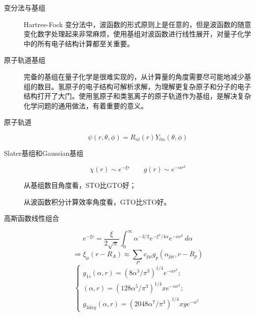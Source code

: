 \documentclass{article}
\numberwithin{equation}{section}
\begin{document}
\begin{description}
	\item[变分法与基组] Hartree-Fock 变分法中，波函数的形式原则上是任意的，但是波函数的随意变化数字处理起来非常麻烦，使用基组对波函数进行线性展开，对量子化学中的所有电子结构计算都至关重要。

	\item[原子轨道基组] 完备的基组在量子化学是很难实现的，从计算量的角度需要尽可能地减少基组的数目。氢原子的电子结构可解析求解，为理解更复杂原子和分子的电子结构打开了大门。使用氢原子和类氢离子的原子轨道作为基组，是解决复杂化学问题的通用做法，有着重要的意义。

	\item[原子轨道]
	\begin{equation}
		\psi(r,\theta,\phi)=R_{nl}(r)Y_{lm}(\theta,\phi)
	\end{equation}

	\item[Slater基组和Gaussian基组]
	\begin{equation}
	\chi(r)\sim e^{-\xi r} \qquad g(r)\sim e^{-\alpha r^2}
	\end{equation}

	从基组数目角度看，STO比GTO好；

	从波函数积分计算效率角度看，GTO比STO好。

	\item[高斯函数线性组合]
	\begin{equation}
	e^{-\xi r}=\frac{\xi}{2\sqrt{\pi}}\int_0^\infty \alpha^{-3/2} e^{-\xi^2/4\alpha}e^{-\alpha r^2} \, d\alpha
	\end{equation}
	\begin{equation}
	\Rightarrow \xi_\mu(r-R_A)\approx \sum_Pc_{p\mu}g_p(\alpha_{p\mu},r-R_p)
	\end{equation}
	\begin{equation}
	\begin{cases}
	g_{1s}(\alpha,r)=(8\alpha^3/\pi^3)^{1/4}e^{-\alpha r^2};\\
	(\alpha,r)=(128\alpha^5/\pi^3)^{1/4}xe^{-\alpha r^2};\\
	g_{3dxy}(\alpha,r)=(2048\alpha^7/\pi^3)^{1/4}xye^{-\alpha^2}
	\end{cases}
	\end{equation}
\end{description}
\end{document}
